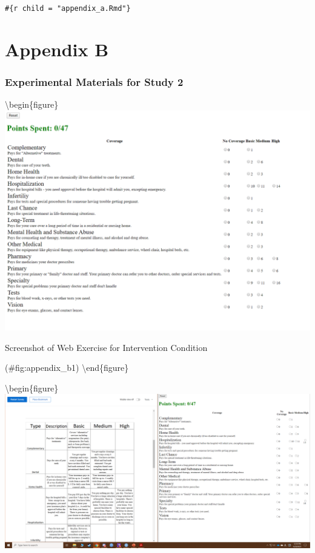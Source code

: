 \documentclass[
  english,
  man]{apa6}
\begin{document}
\texttt{\#\{r\ child\ =\ "appendix\_a.Rmd"\}}

\hypertarget{appendix-b}{%
\section{Appendix B}\label{appendix-b}}

\hypertarget{experimental-materials-for-study-2}{%
\subsubsection{Experimental Materials for Study 2}\label{experimental-materials-for-study-2}}

\textbackslash begin\{figure\}
\includegraphics[width=1\linewidth]{appendix_b_1}

\caption{Screenshot of Web Exercise for Intervention Condition}

(\#fig:appendix\_b1)
\textbackslash end\{figure\}

\textbackslash begin\{figure\}
\includegraphics[width=1\linewidth]{appendix_b_2}
\end{document}
